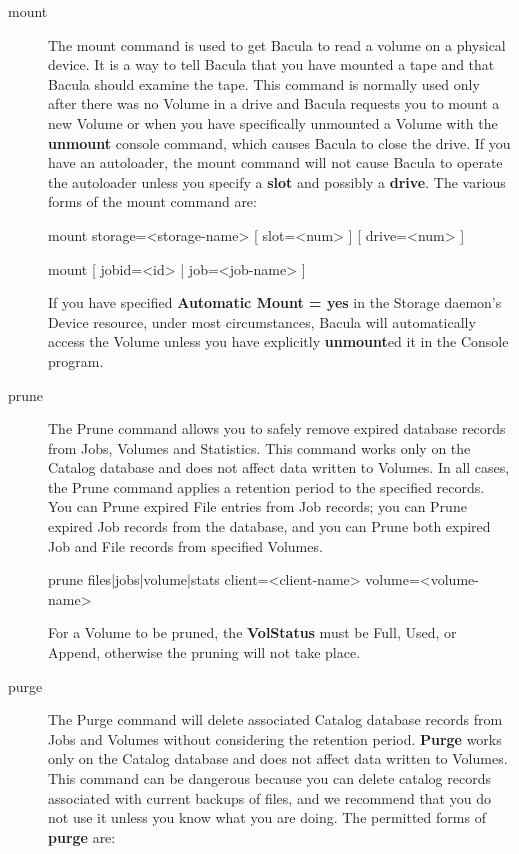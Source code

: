 \begin{description}
\item [mount]
   The mount command is used to get Bacula to read a volume on a physical
   device.  It is a way to tell Bacula that you have mounted a tape and
   that Bacula should examine the tape.  This command is normally
   used only after there was no Volume in a drive and Bacula requests you to mount a new
   Volume or when you have specifically unmounted a Volume with the {\bf
   unmount} console command, which causes Bacula to close the drive.  If
   you have an autoloader, the mount command will not cause Bacula to
   operate the autoloader unless you specify a {\bf slot} and possibly a
   {\bf drive}. The various forms of the mount command are:

mount  storage={\textless}storage-name{\textgreater} [ slot={\textless}num{\textgreater} ] [
       drive={\textless}num{\textgreater} ]

mount [ jobid={\textless}id{\textgreater} |  job={\textless}job-name{\textgreater} ]

   If you have specified {\bf Automatic  Mount = yes} in the Storage daemon's
   Device resource,  under most circumstances, Bacula will automatically access
   the Volume unless you have explicitly {\bf unmount}ed it in  the Console
   program.

\label{ManualPruning}
\item [prune]
   The Prune command allows you to safely remove expired database records from
   Jobs, Volumes and Statistics.  This command works only on the Catalog
   database and does not affect data written to Volumes.  In all cases, the
   Prune command applies a retention period to the specified records.  You can
   Prune expired File entries from Job records; you can Prune expired Job
   records from the database, and you can Prune both expired Job and File
   records from specified Volumes.

prune files|jobs|volume|stats client={\textless}client-name{\textgreater}
volume={\textless}volume-name{\textgreater}

   For a Volume to be pruned, the {\bf VolStatus} must be Full, Used, or
   Append, otherwise the pruning will not take place.

\item [purge]
   The Purge command will delete associated Catalog database records from
   Jobs and Volumes without considering the retention period.  {\bf Purge}
   works only on the Catalog database and does not affect data written to
   Volumes.  This command can be dangerous because you can delete catalog
   records associated with current backups of files, and we recommend that
   you do not use it unless you know what you are doing.  The permitted
   forms of {\bf purge} are:


\end{description}
